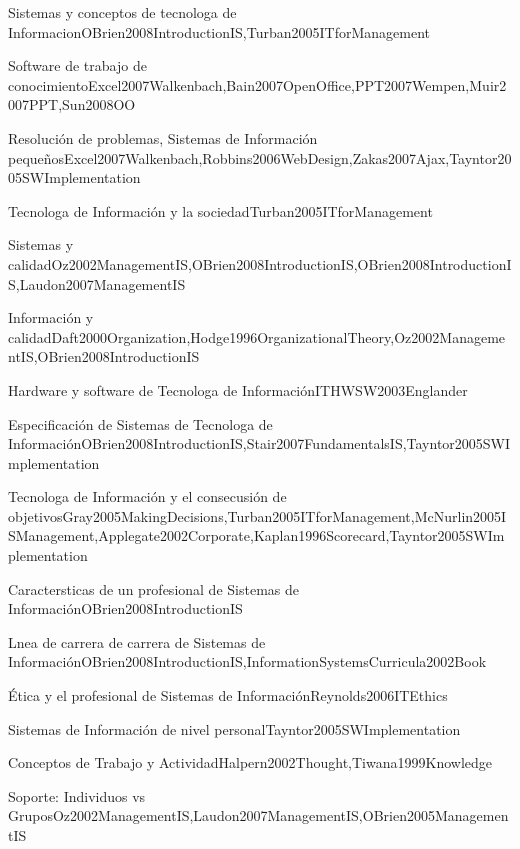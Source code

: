 \begin{LU1}{Sistemas y conceptos de tecnolog­a de Informacion}{OBrien2008IntroductionIS,Turban2005ITforManagement}{}
\begin{LU2}{Software de trabajo de conocimiento}{Excel2007Walkenbach,Bain2007OpenOffice,PPT2007Wempen,Muir2007PPT,Sun2008OO}{}
\begin{LU3}{Resolución de problemas, Sistemas de Información pequeños}{Excel2007Walkenbach,Robbins2006WebDesign,Zakas2007Ajax,Tayntor2005SWImplementation}{}
\begin{LU4}{Tecnolog­a de Información y la sociedad}{Turban2005ITforManagement}{}
\begin{LU5}{Sistemas y calidad}{Oz2002ManagementIS,OBrien2008IntroductionIS,OBrien2008IntroductionIS,Laudon2007ManagementIS}{}
\begin{LU6}{Información y calidad}{Daft2000Organization,Hodge1996OrganizationalTheory,Oz2002ManagementIS,OBrien2008IntroductionIS}{}
\begin{LU7}{Hardware y software de Tecnolog­a de Información}{ITHWSW2003Englander}{}
\begin{LU8}{Especificación de Sistemas de Tecnolog­a de Información}{OBrien2008IntroductionIS,Stair2007FundamentalsIS,Tayntor2005SWImplementation}{}
\begin{LU9}{Tecnolog­a de Información y el consecusión de objetivos}{Gray2005MakingDecisions,Turban2005ITforManagement,McNurlin2005ISManagement,Applegate2002Corporate,Kaplan1996Scorecard,Tayntor2005SWImplementation}{}
\begin{LU10}{Caracter­sticas de un profesional de Sistemas de Información}{OBrien2008IntroductionIS}{}
\begin{LU11}{L­nea de carrera de carrera de Sistemas de Información}{OBrien2008IntroductionIS,InformationSystemsCurricula2002Book}{}
\begin{LU12}{Ética y el profesional de Sistemas de Información}{Reynolds2006ITEthics}{}
\begin{LU13}{Sistemas de Información de nivel personal}{Tayntor2005SWImplementation}{}
\begin{LU13.01}[LU13]{Conceptos de Trabajo y Actividad}{Halpern2002Thought,Tiwana1999Knowledge}{}
\begin{LU13.02}[LU13]{Soporte: Individuos vs Grupos}{Oz2002ManagementIS,Laudon2007ManagementIS,OBrien2005ManagementIS}{}
\end{LU13.02}
\end{LU13.01}
\end{LU13}
\end{LU12}
\end{LU11}
\end{LU10}
\end{LU9}
\end{LU8}
\end{LU7}
\end{LU6}
\end{LU5}
\end{LU4}
\end{LU3}
\end{LU2}
\end{LU1}
